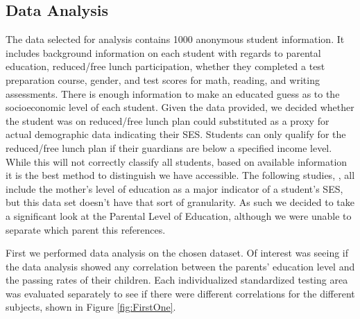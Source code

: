 \documentclass[man,floatsintext]{apa6} %
\begin{document}
\subsection{Data Analysis}
The data selected for analysis contains 1000 anonymous student information. It includes background information on each student with regards to parental education, reduced/free lunch participation, whether they completed a test preparation course, gender, and test scores for math, reading, and writing assessments. There is enough information to make an educated guess as to the socioeconomic level of each student. Given the data provided, we decided whether the student was on reduced/free lunch plan could substituted as a proxy for actual demographic data indicating their SES. Students can only qualify for the reduced/free lunch plan if their guardians are below a specified income level. While this will not correctly classify all students, based on available information it is the best method to distinguish we have accessible. The following studies, \cite{maternaleducation} \cite{maternaleducation2} \cite{maternaleducation3}
, all include the mother's level of education as a major indicator of a student's SES, but this data set doesn't have that sort of granularity. As such we decided to take a significant look at the Parental Level of Education, although we were unable to separate which parent this references.

First we performed data analysis on the chosen dataset. Of interest was seeing if the data analysis showed any correlation between the parents' education level and the passing rates of their children. Each individualized standardized testing area was evaluated separately to see if there were different correlations for the different subjects, shown in Figure \ref{fig:FirstOne}. 
\end{document}
